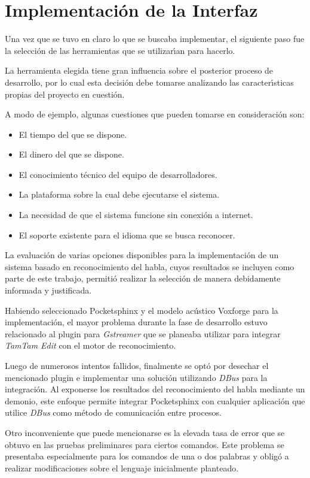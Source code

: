 \section{Implementaci\'on de la Interfaz}
\label{sec:implementacion-interfaz}

Una vez que se tuvo en claro lo que se buscaba implementar, el siguiente paso
fue la selecci\'on de las herramientas que se utilizar{\'\i}an para hacerlo. 

La herramienta elegida tiene gran influencia sobre el posterior proceso de
desarrollo, por lo cual esta decisi\'on debe tomarse analizando las caracter{\'\i}sticas
propias del proyecto en cuesti\'on.

A modo de ejemplo, algunas cuestiones que pueden tomarse en consideraci\'on son:

\begin{itemize}
	\item El tiempo del que se dispone.
	\item El dinero del que se dispone.
	\item El conocimiento t\'ecnico del equipo de desarrolladores.
	\item La plataforma sobre la cual debe ejecutarse el sistema.
	\item La necesidad de que el sistema funcione sin conexi\'on a internet.
	\item El soporte existente para el idioma que se busca reconocer.
\end{itemize}

La evaluaci\'on de varias opciones disponibles para la implementaci\'on de un sistema
basado en reconocimiento del habla, cuyos resultados se incluyen como parte de este
trabajo, permiti\'o realizar la selecci\'on de manera debidamente informada y justificada.

Habiendo seleccionado Pocketsphinx y el modelo ac\'ustico Voxforge para
la implementaci\'on, el mayor problema durante la fase de desarrollo estuvo relacionado
al plugin para \emph{Gstreamer} que se planeaba utilizar para integrar \emph{TamTam Edit}
con el motor de reconocimiento.

Luego de numerosos intentos fallidos, finalmente se opt\'o por desechar el mencionado plugin
e implementar una soluci\'on utilizando \emph{DBus} para la integraci\'on. Al exponerse los
resultados del reconocimiento del habla mediante un demonio, este enfoque permite integrar
Pocketsphinx con cualquier aplicaci\'on que utilice \emph{DBus} como m\'etodo de comunicaci\'on
entre procesos.

Otro inconveniente que puede mencionarse es la elevada tasa de error que se obtuvo en las
pruebas preliminares para ciertos comandos. Este problema se presentaba especialmente para
los comandos de una o dos palabras y oblig\'o a realizar modificaciones sobre el lenguaje
inicialmente planteado.